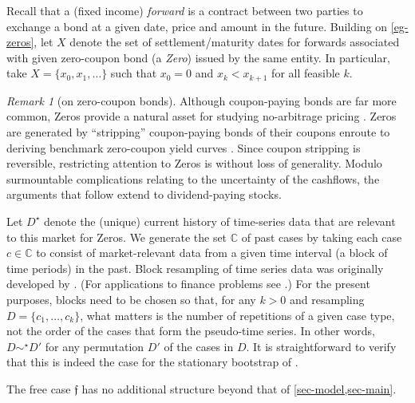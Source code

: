\documentclass[ecta,nameyear,draft]{econsocart}
\newcommand{\novel}{\mathfrak f}
\newcommand{\mbbc}{{\mathds C}}
\newcommand{\past}{{D^\star}}
\theoremstyle{plain}
\theoremstyle{remark}
\newtheorem*{remark*}{Remark}
\begin{document}
Recall that a (fixed income) \emph{forward} is a contract between two parties
to exchange a bond at a given date, price and amount in the future.  Building
on \cref{eg-zeros}, let $X$ denote the set of settlement/maturity dates for
forwards associated with given zero-coupon bond (a \emph{Zero}) issued by the
same entity. In particular, take $X = \{x_0, x_1, \dots\}$ such that $x_0 = 0$
and $x_k < x_{k + 1}$ for all feasible $k$. 
\begin{remark*}[on zero-coupon bonds] Although coupon-paying bonds are far more
  common, Zeros provide a natural asset for studying no-arbitrage pricing
  \citep{barillas2019speculation}. Zeros are generated by ``stripping''
  coupon-paying bonds of their coupons enroute to deriving benchmark
  zero-coupon yield curves \citep{brealey2020principles}. Since coupon
  stripping is reversible, restricting attention to Zeros is without loss of
  generality. Modulo surmountable complications relating to the uncertainty of
  the cashflows, the arguments that follow extend to dividend-paying stocks.
\end{remark*}

Let $\past$ denote the (unique) current history of time-series data that are
relevant to this market for Zeros.  We generate the set $\mbbc$ of past cases
by taking each case $c \in \mbbc$ to consist of market-relevant data from a
given time interval (a block of time periods) in the past. Block resampling of
time series data was originally developed by
\citet{kunsch1989jackknife,politis1994stationary}. (For applications to finance
problems see \citet{white2000reality,harvey2021lucky}.) For the present
purposes, blocks need to be chosen so that, for any $k > 0$ and resampling $D =
\{c_1, \dots, c_k\}$, what matters is the number of repetitions of a given case
type, not the order of the cases that form the pseudo-time series. In other
words, $D \sim^\star D'$ for any permutation $D'$ of the cases in $D$.  It is
straightforward to verify that this is indeed the case for the stationary
bootstrap of \citet[section 2]{politis1994stationary}.

The free case $\novel$ has no additional structure beyond that of
\cref{sec-model,sec-main}.
\end{document}
